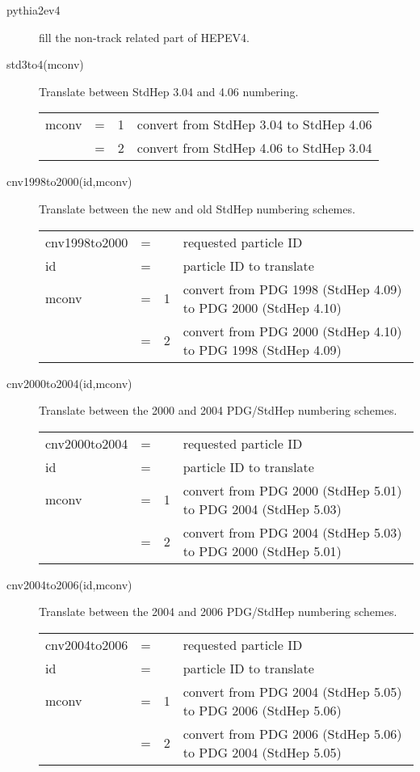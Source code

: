 \begin{description}
\item[pythia2ev4]  fill the non-track related part of HEPEV4.

\item[std3to4(mconv)] Translate between StdHep 3.04 and 4.06 numbering.  

\begin{tabular}{lcll}
mconv & = & 1 & convert from StdHep 3.04 to StdHep 4.06 \\
      & = & 2 & convert from StdHep 4.06 to StdHep 3.04 \\
\end{tabular}

\item[cnv1998to2000(id,mconv)] Translate between the new and old StdHep numbering schemes.

\begin{tabular}{lcll}
cnv1998to2000 & = &   & requested particle ID \\
id            & = &   & particle ID to translate \\
mconv         & = & 1 & convert from PDG 1998 (StdHep 4.09) to PDG 2000 (StdHep 4.10)  \\
              & = & 2 & convert from PDG 2000 (StdHep 4.10) to PDG 1998 (StdHep 4.09)  \\
\end{tabular}

\item[cnv2000to2004(id,mconv)] Translate between the 2000 and 2004 PDG/StdHep numbering schemes.

\begin{tabular}{lcll}
cnv2000to2004 & = &   & requested particle ID \\
id            & = &   & particle ID to translate \\
mconv         & = & 1 & convert from PDG 2000 (StdHep 5.01) to PDG 2004 (StdHep 5.03)  \\
              & = & 2 & convert from PDG 2004 (StdHep 5.03) to PDG 2000 (StdHep 5.01)  \\
\end{tabular}

\item[cnv2004to2006(id,mconv)] Translate between the 2004 and 2006 PDG/StdHep numbering schemes.

\begin{tabular}{lcll}
cnv2004to2006 & = &   & requested particle ID \\
id            & = &   & particle ID to translate \\
mconv         & = & 1 & convert from PDG 2004 (StdHep 5.05) to PDG 2006 (StdHep 5.06)  \\
              & = & 2 & convert from PDG 2006 (StdHep 5.06) to PDG 2004 (StdHep 5.05)  \\
\end{tabular}


\end{description}
